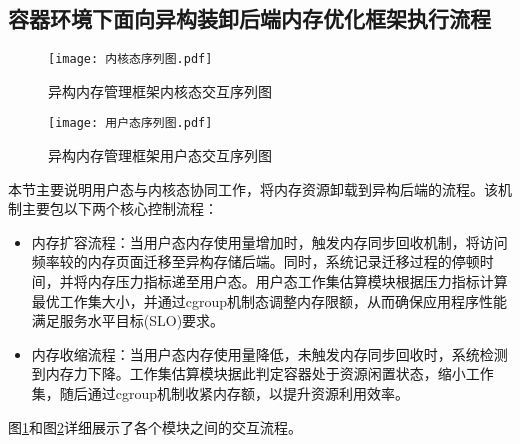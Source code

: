 \subsection{容器环境下面向异构装卸后端内存优化框架执行流程}
\label{sec:容器环境下面向异构装卸后端内存优化框架执行流程}

\begin{figure}[h]
\centering
\texttt{[image: 内核态序列图.pdf]}
\caption{异构内存管理框架内核态交互序列图}
\label{fig:kernel_sequence_diagram_1}
\end{figure}

\begin{figure}[h]
\centering
\texttt{[image: 用户态序列图.pdf]}
\caption{异构内存管理框架用户态交互序列图}
\label{fig:kernel_sequence_diagram_2}
\end{figure}

本节主要说明用户态与内核态协同工作，将内存资源卸载到异构后端的流程。该机制主要包以下两个核心控制流程：

\begin{itemize}
\item 内存扩容流程：当用户态内存使用量增加时，触发内存同步回收机制，将访问频率较的内存页面迁移至异构存储后端。同时，系统记录迁移过程的停顿时间，并将内存压力指标递至用户态。用户态工作集估算模块根据压力指标计算最优工作集大小，并通过cgroup机制态调整内存限额，从而确保应用程序性能满足服务水平目标(SLO)要求。
\item 内存收缩流程：当用户态内存使用量降低，未触发内存同步回收时，系统检测到内存力下降。工作集估算模块据此判定容器处于资源闲置状态，缩小工作集，随后通过cgroup机制收紧内存额，以提升资源利用效率。
\end{itemize}

图\ref{fig:kernel_sequence_diagram_1}和图\ref{fig:kernel_sequence_diagram_2}详细展示了各个模块之间的交互流程。

